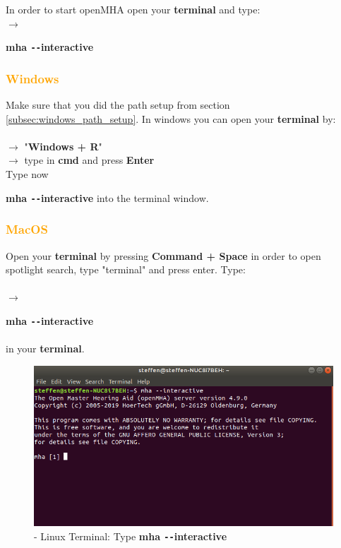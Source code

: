 \documentclass[11pt,a4paper,twoside]{article}
\newcommand{\+}{\discretionary{\mbox{\scriptsize$\hookleftarrow$}}{}{}}
\begin{document}
In order to start openMHA open your \textbf{terminal} and type: \\
$\rightarrow$ {{\ttfamily \textbf{mha \texttt{-{}-}interactive}} 


\subsubsection*{\textcolor{orange}{Windows}}}
Make sure that you did the path setup from section \ref{subsec:windows_path_setup}.
In windows you can open your \textbf{terminal} by: \\ \\
$\rightarrow$ "\textbf{Windows + R}" \\
    $\rightarrow$ type in {{\ttfamily \textbf{cmd}}} and press \textbf{Enter} \\
    Type now {{\ttfamily \textbf{mha \texttt{-{}-}interactive}}  into the terminal window. 
   


\subsubsection*{\textcolor{orange}{MacOS}}

Open your \textbf{terminal} by pressing \textbf{Command + Space} in order to open spotlight search, type "terminal" and press enter. Type: \\ \\
$\rightarrow$ {{\ttfamily \textbf{mha \texttt{-{}-}interactive}} \\ \\ in your \textbf{terminal}.\\


\begin{figure}[H]
\centering
\includegraphics[scale=0.4]{mha_interactive.png}
\caption{- Linux Terminal: Type {{\ttfamily \textbf{mha \texttt{-{}-}interactive}}}}
\end{figure}


}}
\end{document}

